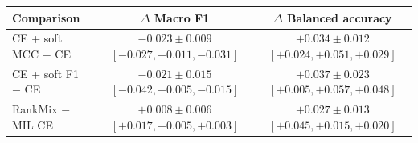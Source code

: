 \begin{tabular}{lcc}
\toprule
Comparison & $\Delta$ Macro F1 & $\Delta$ Balanced accuracy\\
\midrule
CE + soft MCC $-$ CE & $-0.023 \pm 0.009$ {\scriptsize $[-0.027, -0.011, -0.031]$} & $+0.034 \pm 0.012$ {\scriptsize $[+0.024, +0.051, +0.029]$}\\
CE + soft F1 $-$ CE & $-0.021 \pm 0.015$ {\scriptsize $[-0.042, -0.005, -0.015]$} & $+0.037 \pm 0.023$ {\scriptsize $[+0.005, +0.057, +0.048]$}\\
RankMix $-$ MIL CE & $+0.008 \pm 0.006$ {\scriptsize $[+0.017, +0.005, +0.003]$} & $+0.027 \pm 0.013$ {\scriptsize $[+0.045, +0.015, +0.020]$}\\
\bottomrule
\end{tabular}
